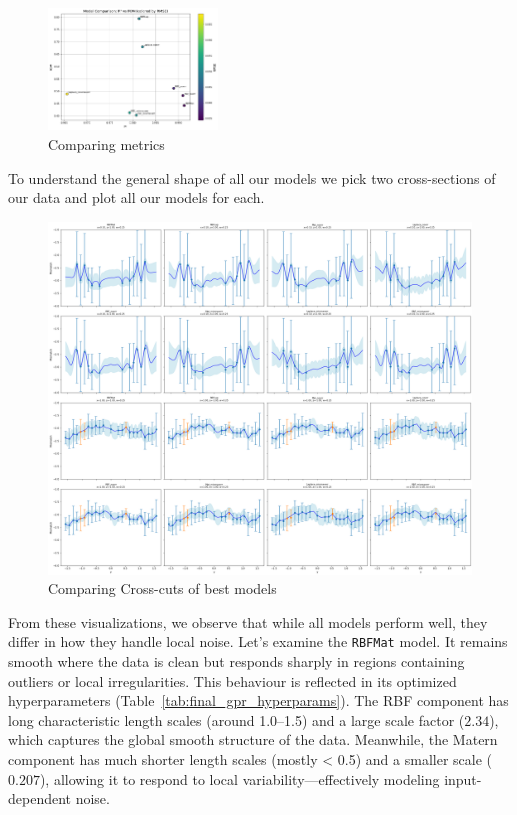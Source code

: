 \documentclass{article}
\begin{document}
\begin{figure}[H]
    \centering
    \includegraphics[width=0.4\textwidth]{LatexPlots/final_gps_plots/metric_of_finalists_comparison.png}
    \caption{Comparing metrics}
    \label{fig:comparing_metrics}
\end{figure}
\noindent
To understand the general shape of all our models we pick two cross-sections of our data and plot all our models for each.
\begin{figure}[H]
    \centering
    \includegraphics[width=1\textwidth]{LatexPlots/final_gps_plots/gps_crosscuts_bestmodels.png}
    \caption{Comparing Cross-cuts of best models}
    \label{fig:crosscuts_bestmodels}
\end{figure}

\noindent
From these visualizations, we observe that while all models perform well, they differ in how they handle local noise.
Let's examine the \texttt{RBFMat} model. It remains smooth where the data is clean but responds sharply in regions containing outliers or local irregularities.
This behaviour is reflected in its optimized hyperparameters (Table~\ref{tab:final_gpr_hyperparams}). The RBF component has long characteristic length scales (around 1.0--1.5) and a large scale factor ($2.34$),
which captures the global smooth structure of the data. Meanwhile, the Matern component has much shorter length scales (mostly < 0.5) and a smaller scale ($0.207$), allowing it to respond to local variability—effectively modeling input-dependent noise.
\end{document}

